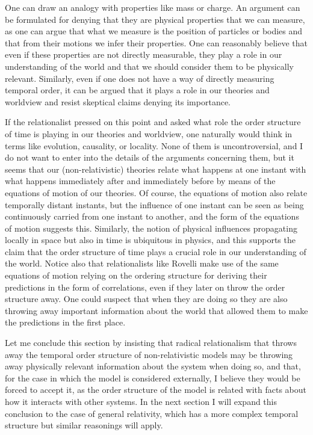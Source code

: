 \documentclass[12 pt]{article}
\begin{document}
One can draw an analogy with properties like mass or charge. An argument can be formulated for denying that they are physical properties that we can measure, as one can argue that what we measure is the position of particles or bodies and that from their motions we infer their properties. One can reasonably believe that even if these properties are not directly measurable, they play a role in our understanding of the world and that we should consider them to be physically relevant. Similarly, even if one does not have a way of directly measuring temporal order, it can be argued that it plays a role in our theories and worldview and resist skeptical claims denying its importance.

If the relationalist pressed on this point and asked what role the order structure of time is playing in our theories and worldview, one naturally would think in terms like evolution, causality, or locality. None of them is uncontroversial, and I do not want to enter into the details of the arguments concerning them, but it seems that our (non-relativistic) theories relate what happens at one instant with what happens immediately after and immediately before by means of the equations of motion of our theories. Of course, the equations of motion also relate temporally distant instants, but the influence of one instant can be seen as being continuously carried from one instant to another, and the form of the equations of motion suggests this. Similarly, the notion of physical influences propagating locally in space but also in time is ubiquitous in physics, and this supports the claim that the order structure of time plays a crucial role in our understanding of the world. Notice also that relationalists like Rovelli make use of the same equations of motion relying on the ordering structure for deriving their predictions in the form of correlations, even if they later on throw the order structure away. One could suspect that when they are doing so they are also throwing away important information about the world that allowed them to make the predictions in the first place.

Let me conclude this section by insisting that radical relationalism that throws away the temporal order structure of non-relativistic models may be throwing away physically relevant information about the system when doing so, and that, for the case in which the model is considered externally, I believe they would be forced to accept it, as the order structure of the model is related with facts about how it interacts with other systems. In the next section I will expand this conclusion to the case of general relativity, which has a more complex temporal structure but similar reasonings will apply.
\end{document}
